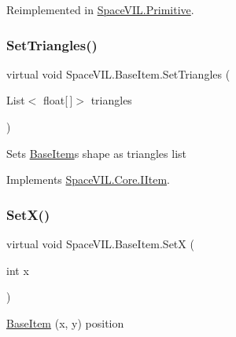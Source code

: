 Reimplemented in \mbox{\hyperlink{class_space_v_i_l_1_1_primitive_ad2a9fbb75eddf7f36af72385a5453fb2}{Space\+V\+I\+L.\+Primitive}}.

\mbox{\label{class_space_v_i_l_1_1_base_item_abce4d28de70cae71fde1612342e519a4}} 
\subsubsection{\texorpdfstring{Set\+Triangles()}{SetTriangles()}}
{\footnotesize\ttfamily virtual void Space\+V\+I\+L.\+Base\+Item.\+Set\+Triangles (\begin{DoxyParamCaption}\item[{List$<$ float\mbox{[}$\,$\mbox{]}$>$}]{triangles }\end{DoxyParamCaption})\hspace{0.3cm}{\ttfamily [virtual]}}



Sets \mbox{\hyperlink{class_space_v_i_l_1_1_base_item}{Base\+Item}}\textquotesingle{}s shape as triangles list 



Implements \mbox{\hyperlink{interface_space_v_i_l_1_1_core_1_1_i_item}{Space\+V\+I\+L.\+Core.\+I\+Item}}.

\mbox{\label{class_space_v_i_l_1_1_base_item_a6ad3ba5bf9637b193d78b22ee2867434}} 
\subsubsection{\texorpdfstring{Set\+X()}{SetX()}}
{\footnotesize\ttfamily virtual void Space\+V\+I\+L.\+Base\+Item.\+SetX (\begin{DoxyParamCaption}\item[{int}]{x }\end{DoxyParamCaption})\hspace{0.3cm}{\ttfamily [virtual]}}



\mbox{\hyperlink{class_space_v_i_l_1_1_base_item}{Base\+Item}} (x, y) position 



